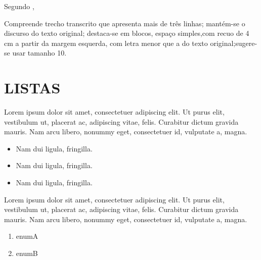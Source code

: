 Segundo  ,
\begin{citacao}
Compreende trecho transcrito que apresenta mais de três linhas; mantém-se o discurso do texto original; destaca-se em blocos, espaço simples,com recuo de 4 cm a partir da margem esquerda, com letra menor que a do texto original;sugere-se usar tamanho 10.
\end{citacao}

\section {LISTAS}
 Lorem ipsum dolor sit amet, consectetuer adipiscing elit. Ut purus elit, vestibulum ut, placerat ac, adipiscing vitae, felis. Curabitur dictum gravida mauris. Nam arcu libero, nonummy eget, consectetuer id, vulputate a, magna.

\begin{itemize}
\item Nam dui ligula, fringilla.
\item Nam dui ligula, fringilla.
\item Nam dui ligula, fringilla.
\end{itemize}

Lorem ipsum dolor sit amet, consectetuer adipiscing elit. Ut purus elit, vestibulum ut, placerat ac, adipiscing vitae, felis. Curabitur dictum gravida mauris. Nam arcu libero, nonummy eget, consectetuer id, vulputate a, magna.

\begin{enumerate}
 \item enumA
 \item enumB
\end{enumerate}
